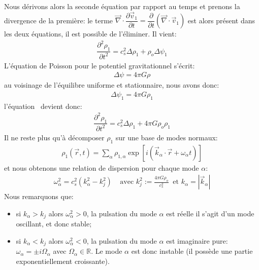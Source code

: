 Nous dérivons alors la seconde équation par rapport au temps et prenons la divergence de la première: le terme $\vec{\nabla}\cdot\dfrac
{\partial\vec{v}_{1}}{\partial t}=\dfrac{\partial}{\partial t}\left( \vec{\nabla}\cdot\vec{v}_{1}\right)$ est alors présent dans les deux équations,
il est possible de l'éliminer. Il vient:
\begin{align}
	\dfrac{\partial^{2}\rho_{1}}{\partial t^{2}}=c_{s}^{2}\Delta\rho_{1}+\rho_{o}\Delta\psi_{1}\label{inter1jeans}
\end{align}
L'équation de Poisson pour le potentiel gravitationnel s'écrit:
\begin{align*}
	\Delta\psi=4\pi G\rho
\end{align*}
au voisinage de l'équilibre uniforme et stationnaire, nous avons donc:
\begin{align*}
	\Delta\psi_{1}=4\pi G\rho_{1}%
\end{align*}
l'équation~ devient donc:
\begin{align*}
	\dfrac{\partial^{2}\rho_{1}}{\partial t^{2}}=c_{s}^{2}\Delta\rho_{1}+4\pi G\rho_{o}\rho_{1}
\end{align*}
Il ne reste plus qu'à décomposer $\rho_{1}$ sur une base de modes normaux:
\begin{align*}
	\rho_{1}\left(  \vec{r},t\right)  =\sum_{\alpha}\rho_{1,\alpha}\exp\left[i\left(  \vec{k}_{\alpha}\cdot\vec{r}+\omega_{\alpha}t\right)  \right]
\end{align*}
et nous obtenons une relation de dispersion pour chaque mode $\alpha$:
\begin{align*}
	\omega_{\alpha}^{2}=c_{s}^{2}\left(  k_{\alpha}^{2}-k_{j}^{2}\right)
	\ \ \ \ \ \text{avec }k_{j}^{2}:=\frac{4\pi G\rho_{o}}{c_{s}^{2}}\ \text{\ et
	\ }k_{\alpha}=\left\vert \vec{k}_{\alpha}\right\vert
\end{align*}
Nous remarquons que:
\begin{itemize}

	\item si $k_{\alpha}>k_{j}$ alors $\omega_{\alpha}^{2}>0$, la pulsation du mode $\alpha$ est réelle il s'agit d'un mode oscillant, et donc
		stable;

	\item si $k_{\alpha}<k_{j}$ alors $\omega_{\alpha}^{2}<0$, la pulsation du mode $\alpha$ est imaginaire pure: $\omega_{\alpha}=\pm
		i\Omega_{\alpha}$ avec $\Omega_{\alpha}\in\mathbb{R}$. Le mode $\alpha$ est donc instable (il possède une partie exponentiellement
		croissante).

\end{itemize}

